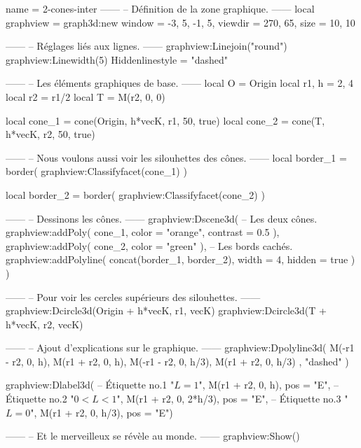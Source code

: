 \documentclass{standalone}
\begin{document}
\begin{luadraw}{name = 2-cones-inter}
------
-- Définition de la zone graphique.
------
local graphview = graph3d:new{
  window  = {-3, 5, -1, 5},
  viewdir = {270, 65},
  size    = {10, 10}
}

------
-- Réglages liés aux lignes.
------
graphview:Linejoin("round")
graphview:Linewidth(5)
Hiddenlinestyle = "dashed"

------
-- Les éléments graphiques de base.
------
local O     = Origin
local r1, h =  2, 4
local r2    = r1/2
local T     =  M(r2, 0, 0)

local cone_1 = cone(Origin, h*vecK, r1, 50, true)
local cone_2 = cone(T, h*vecK, r2, 50, true)

------
-- Nous voulons aussi voir les silouhettes des cônes.
------
local border_1 = border(
  graphview:Classifyfacet(cone_1)
)

local border_2 = border(
  graphview:Classifyfacet(cone_2)
)

------
-- Dessinons les cônes.
------
graphview:Dscene3d(
-- Les deux cônes.
  graphview:addPoly(
    cone_1,
    {
      color    = "orange",
      contrast = 0.5
    }),
  graphview:addPoly(
    cone_2,
    {
      color = "green"
    }),
-- Les bords cachés.
  graphview:addPolyline(
    concat(border_1, border_2),
    {
      width  = 4,
      hidden = true
    })
)

------
-- Pour voir les cercles supérieurs des silouhettes.
------
graphview:Dcircle3d(Origin + h*vecK, r1, vecK)
graphview:Dcircle3d(T + h*vecK, r2, vecK)

------
-- Ajout d'explications sur le graphique.
------
graphview:Dpolyline3d(
  {
    {M(-r1 - r2,  0,  h), M(r1 + r2,  0,  h)},
    {M(-r1 - r2,  0,  h/3), M(r1 + r2,  0,  h/3)}
  },
  "dashed"
)

graphview:Dlabel3d(
-- Étiquette no.1
  "$L = 1$",
  M(r1 + r2, 0, h),
  {pos = "E"},
-- Étiquette no.2
  "$0 < L <1$",
  M(r1 + r2, 0, 2*h/3),
  {pos = "E"},
-- Étiquette no.3
  "$L = 0$",
  M(r1 + r2, 0, h/3),
  {pos = "E"})

------
-- Et le merveilleux se révèle au monde.
------
graphview:Show()
\end{luadraw}
\end{document}
